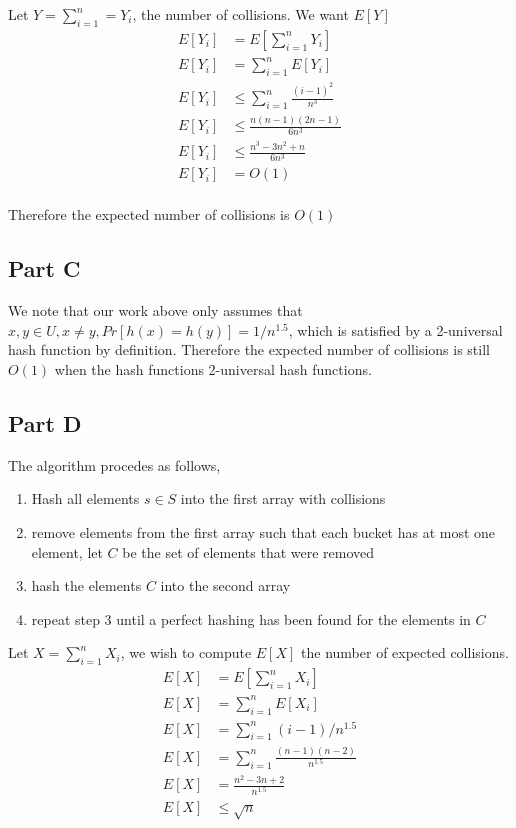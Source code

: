 \documentclass[a4paper]{article}
\begin{document}
Let $Y = \sum_{i=1}^{n} = Y_i$, the number of collisions. We want $E[Y]$
\begin{align*}
	E[Y_i] &= E[\sum_{i=1}^{n} Y_i]\\
	E[Y_i] &= \sum_{i=1}^{n} E[Y_i]\\
	E[Y_i] &\leq \sum_{i=1}^{n} \frac{(i-1)^2}{n^3}\\
	E[Y_i] &\leq \frac{n(n-1)(2n-1)}{6n^3}\\
	E[Y_i] &\leq \frac{n^3 - 3n^2 + n}{6n^3}\\
	E[Y_i] &= O(1)\\
\end{align*}

Therefore the expected number of collisions is $O(1)$
\subsection{Part C}

We note that our work above only assumes that $x,y \in U, x\neq y, Pr[h(x) = h(y)] = 1/n^{1.5}$, which is 
satisfied by a 2-universal hash function by definition. Therefore the expected number of collisions
is still $O(1)$ when the hash functions 2-universal hash functions.
\subsection{Part D}

The algorithm procedes as follows,

\begin{enumerate}
		\item Hash all elements $s\in S$ into the first array with collisions
		\item remove elements from the first array such that each bucket has at most one element, let $C$ be the set of elements that were removed
		\item hash the elements $C$ into the second array 
		\item repeat step 3 until a perfect hashing has been found for the elements in $C$
\end{enumerate}


Let $X = \sum_{i=1}^n X_i$, we wish to compute $E[X]$ the number of expected collisions.
\begin{align*}
	E[X] &= E[\sum_{i=1}^n X_i]\\
	E[X] &= \sum_{i=1}^n E[X_i]\\
	E[X] &= \sum_{i=1}^n (i-1)/n^{1.5}\\
	E[X] &= \sum_{i=1}^n \frac{(n-1)(n-2)}{n^{1.5}}\\
	E[X] &= \frac{n^2 - 3n + 2}{n^{1.5}}\\
	E[X] &\leq \sqrt{n}
\end{align*}
\end{document}

